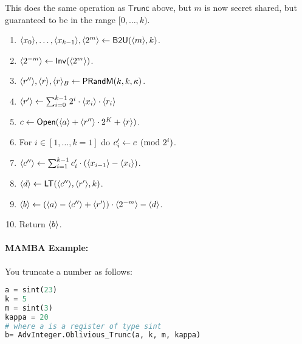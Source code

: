   This does the same operation as $\mathsf{Trunc}$ above, but $m$ is now secret shared, but guaranteed to be in the range $[0,\ldots,k)$.
  \begin{enumerate}
    \item $\langle x_0 \rangle,\ldots,\langle x_{k-1} \rangle, \langle 2^m \rangle \leftarrow \mathsf{B2U}(\langle m \rangle,k)$.
    \item $\langle 2^{-m} \rangle \leftarrow \mathsf{Inv}(\langle 2^m \rangle)$.
    \item $\langle r'' \rangle, \langle r \rangle, \langle r \rangle_B \leftarrow \mathsf{PRandM}(k,k,\kappa)$.
    \item $\langle r' \rangle \leftarrow \sum_{i=0}^{k-1} 2^i \cdot \langle x_i \rangle \cdot \langle r_i \rangle$
    \item $c \leftarrow {\mathsf{Open}}(\langle a \rangle+\langle r'' \rangle \cdot 2^{K} +\langle r \rangle)$.
    \item For $i \in [1,\ldots,k=1]$ do $c_i' \leftarrow c \pmod{2^i}$.
    \item $\langle c'' \rangle \leftarrow \sum_{i=1}^{k-1} c_i' \cdot (\langle x_{i-1} \rangle-\langle x_i \rangle)$.
    \item $\langle d \rangle \leftarrow \mathsf{LT}(\langle c'' \rangle,\langle r' \rangle,k)$.
    \item $\langle b \rangle \leftarrow (\langle a \rangle-\langle c'' \rangle+\langle r' \rangle) \cdot \langle 2^{-m} \rangle - \langle d \rangle$.
    \item Return $\langle b \rangle$.
  \end{enumerate}

  \paragraph{MAMBA Example:} You truncate a number as follows:
  \begin{lstlisting}[language={python}]
a = sint(23)
k = 5
m = sint(3)
kappa = 20
# where a is a register of type sint
b= AdvInteger.Oblivious_Trunc(a, k, m, kappa)
\end{lstlisting}

  \iffalse
    \note{Nigel}{Does not seem to be used anywhere}
    \msubsubsection{$\mathsf{Mod}(\sshare{a},k,x)$:}
    Given $a \in \Zk$ and public $x \in [1,\ldots,2^{k-1}-1]$
    this computes $\sshare{a \pmod{x}}$.
    \begin{enumerate}
      \item $m \asn \ceil{\log_2 x }$.
      \item $\sshare{r'}, \sshare{r}, \sshare{r}_B \asn \mathsf{PRandM}(k,m,\kappa)$.
      \item $c \asn \Open(\sshare{a}+2^{k-1}+\sshare{r}+x \cdot \sshare{r'})$.
      \item $c' \asn c \pmod{x}$.
      \item $\sshare{v} \asn 1 -\mathsf{BitLT}(\sshare{r}_B,x)$.
      \item $\sshare{u} \asn \mathsf{LTZ}(c' - \sshare{r} + x \cdot \sshare{v},m)$.
      \item $\sshare{a'} \asn c' - \sshare{r} + x \cdot ( \sshare{v}+\sshare{u})$.
      \item Return $\sshare{a'}$.
    \end{enumerate}
  \fi

